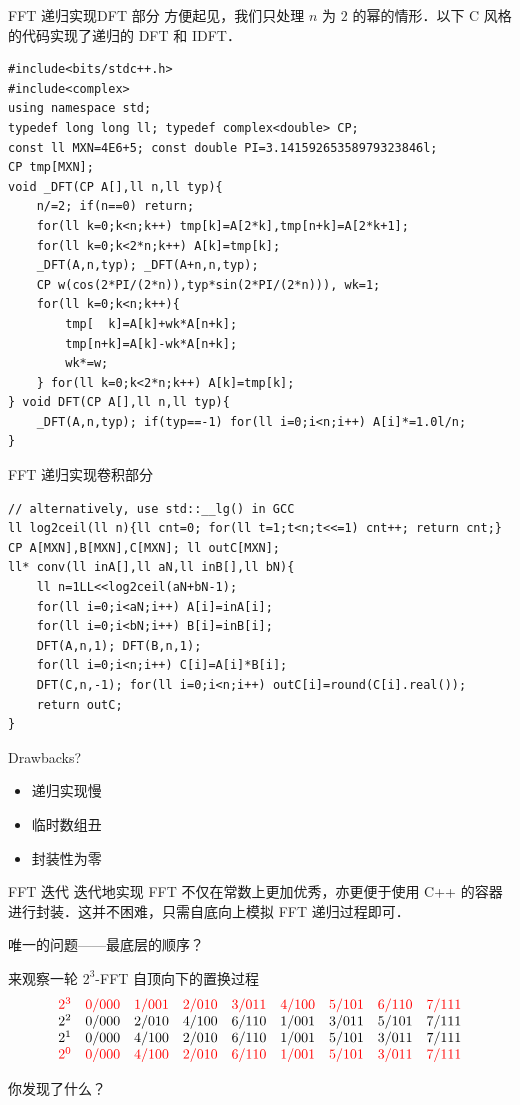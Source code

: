 \documentclass[fontset=fandol]{ctexbeamer}
\begin{document}
\begin{frame}[fragile]{FFT 递归实现}{DFT 部分}
方便起见，我们只处理 $n$ 为 $2$ 的幂的情形．以下 C 风格的代码实现了递归的 DFT 和 IDFT．
{\scriptsize
\begin{verbatim}
#include<bits/stdc++.h>
#include<complex>
using namespace std;
typedef long long ll; typedef complex<double> CP;
const ll MXN=4E6+5; const double PI=3.14159265358979323846l;
CP tmp[MXN];
void _DFT(CP A[],ll n,ll typ){
    n/=2; if(n==0) return;
    for(ll k=0;k<n;k++) tmp[k]=A[2*k],tmp[n+k]=A[2*k+1];
    for(ll k=0;k<2*n;k++) A[k]=tmp[k];
    _DFT(A,n,typ); _DFT(A+n,n,typ);
    CP w(cos(2*PI/(2*n)),typ*sin(2*PI/(2*n))), wk=1;
    for(ll k=0;k<n;k++){
        tmp[  k]=A[k]+wk*A[n+k];
        tmp[n+k]=A[k]-wk*A[n+k];
        wk*=w;
    } for(ll k=0;k<2*n;k++) A[k]=tmp[k];
} void DFT(CP A[],ll n,ll typ){
    _DFT(A,n,typ); if(typ==-1) for(ll i=0;i<n;i++) A[i]*=1.0l/n;
}
\end{verbatim}
}
\end{frame}

\begin{frame}[fragile]{FFT 递归实现}{卷积部分}

{\scriptsize
\begin{verbatim}
// alternatively, use std::__lg() in GCC
ll log2ceil(ll n){ll cnt=0; for(ll t=1;t<n;t<<=1) cnt++; return cnt;} 
CP A[MXN],B[MXN],C[MXN]; ll outC[MXN];
ll* conv(ll inA[],ll aN,ll inB[],ll bN){
    ll n=1LL<<log2ceil(aN+bN-1);
    for(ll i=0;i<aN;i++) A[i]=inA[i];
    for(ll i=0;i<bN;i++) B[i]=inB[i];
    DFT(A,n,1); DFT(B,n,1);
    for(ll i=0;i<n;i++) C[i]=A[i]*B[i];
    DFT(C,n,-1); for(ll i=0;i<n;i++) outC[i]=round(C[i].real());
    return outC;
}
\end{verbatim}
}

Drawbacks?
\begin{itemize}
    \item 递归实现慢
    \item 临时数组丑
    \item 封装性为零
\end{itemize}
\end{frame}

\begin{frame}{FFT 迭代}
迭代地实现 FFT 不仅在常数上更加优秀，亦更便于使用 C++ 的容器进行封装．这并不困难，只需自底向上模拟 FFT 递归过程即可．

唯一的问题——最底层的顺序？

来观察一轮 $2^3$-FFT 自顶向下的置换过程
\[
\begin{matrix}
\mathcolor{red}{2^3 & 0/000 & 1/001 & 2/010 & 3/011 & 4/100 & 5/101 & 6/110 & 7/111} \\
2^2 & 0/000 & 2/010 & 4/100 & 6/110 & 1/001 & 3/011 & 5/101 & 7/111 \\
2^1 & 0/000 & 4/100 & 2/010 & 6/110 & 1/001 & 5/101 & 3/011 & 7/111 \\
\mathcolor{red}{
2^0 & 0/000 & 4/100 & 2/010 & 6/110 & 1/001 & 5/101 & 3/011 & 7/111}
\end{matrix}
\]

你发现了什么？
\end{frame}
\end{document}
